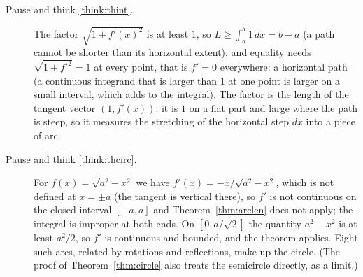 \documentclass[11pt]{article}
\begin{document}
\begin{description}
  \item[Pause and think \ref{think:thint}.] The factor $\sqrt{1+f'(x)^2}$ is at least $1$, so $L\ge\int_a^b1\,dx=b-a$ (a path cannot be shorter than its horizontal extent), and equality needs $\sqrt{1+f'^2}=1$ at every point, that is $f'=0$ everywhere: a horizontal path (a continuous integrand that is larger than $1$ at one point is larger on a small interval, which adds to the integral). The factor is the length of the tangent vector $(1,f'(x))$: it is $1$ on a flat part and large where the path is steep, so it measures the stretching of the horizontal step $dx$ into a piece of arc.

  \item[Pause and think \ref{think:thcirc}.] For $f(x)=\sqrt{a^2-x^2}$ we have $f'(x)=-x/\sqrt{a^2-x^2}$, which is not defined at $x=\pm a$ (the tangent is vertical there), so $f'$ is not continuous on the closed interval $[-a,a]$ and Theorem~\ref{thm:arclen} does not apply; the integral is improper at both ends. On $[0,a/\sqrt2]$ the quantity $a^2-x^2$ is at least $a^2/2$, so $f'$ is continuous and bounded, and the theorem applies. Eight such arcs, related by rotations and reflections, make up the circle. (The proof of Theorem~\ref{thm:circle} also treats the semicircle directly, as a limit.)

\end{description}
\end{document}

